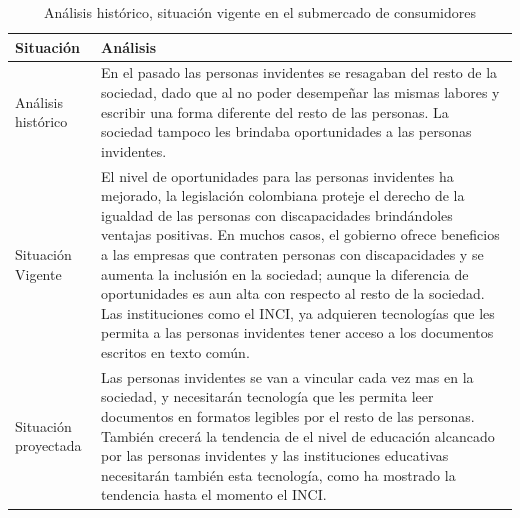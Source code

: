 \documentclass[a4paper, 12pt, oneside]{article}
\begin{document}
	\begin{table}
		\caption{Análisis histórico, situación vigente en el submercado de consumidores}
		\begin{tabular}{ | p{4cm} | p{10cm} | }
		\hline
		Situación & Análisis \\
		\hline					
		Análisis histórico & 
		En el pasado las personas invidentes se resagaban del resto de la sociedad, dado que al no poder desempeñar las mismas labores y escribir una forma diferente del resto de las personas. La sociedad tampoco les brindaba oportunidades a las personas invidentes. \\
		\hline
		Situación Vigente &
		El nivel de oportunidades para las personas invidentes ha mejorado, la legislación colombiana proteje el derecho de la igualdad de las personas con discapacidades brindándoles ventajas positivas. En muchos casos, el gobierno ofrece beneficios a las empresas que contraten personas con discapacidades y se aumenta la inclusión en la sociedad; aunque la diferencia de oportunidades es aun alta con respecto al resto de la sociedad. Las instituciones como el INCI, ya adquieren tecnologías que les permita a las personas invidentes tener acceso a los documentos escritos en texto común. \\
		\hline
		Situación proyectada &
		Las personas invidentes se van a vincular cada vez mas en la sociedad, y necesitarán tecnología que les permita leer documentos en formatos legibles por el resto de las personas. También crecerá la tendencia de el nivel de educación alcancado por las personas invidentes y las instituciones educativas necesitarán también esta tecnología, como ha mostrado la tendencia hasta el momento el INCI.
		 \\
		\hline
		\end{tabular}
		\label{consHistorico}
	\end{table}
	
\end{document}

